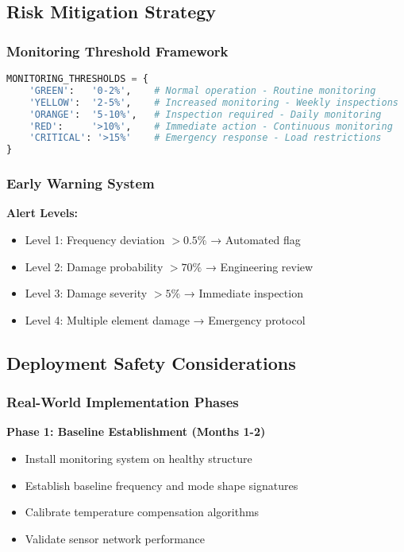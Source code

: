 \documentclass[12pt,a4paper]{article}
\begin{document}
\subsection{Risk Mitigation Strategy}

\subsubsection{Monitoring Threshold Framework}

\begin{lstlisting}[language=Python, caption=Monitoring Thresholds]
MONITORING_THRESHOLDS = {
    'GREEN':   '0-2%',    # Normal operation - Routine monitoring
    'YELLOW':  '2-5%',    # Increased monitoring - Weekly inspections
    'ORANGE':  '5-10%',   # Inspection required - Daily monitoring
    'RED':     '>10%',    # Immediate action - Continuous monitoring
    'CRITICAL': '>15%'    # Emergency response - Load restrictions
}
\end{lstlisting}

\subsubsection{Early Warning System}

\textbf{Alert Levels:}
\begin{itemize}
    \item Level 1: Frequency deviation $>0.5\%$ → Automated flag
    \item Level 2: Damage probability $>70\%$ → Engineering review
    \item Level 3: Damage severity $>5\%$ → Immediate inspection
    \item Level 4: Multiple element damage → Emergency protocol
\end{itemize}

\subsection{Deployment Safety Considerations}

\subsubsection{Real-World Implementation Phases}

\textbf{Phase 1: Baseline Establishment (Months 1-2)}
\begin{itemize}
    \item Install monitoring system on healthy structure
    \item Establish baseline frequency and mode shape signatures
    \item Calibrate temperature compensation algorithms
    \item Validate sensor network performance
\end{itemize}
\end{document}
